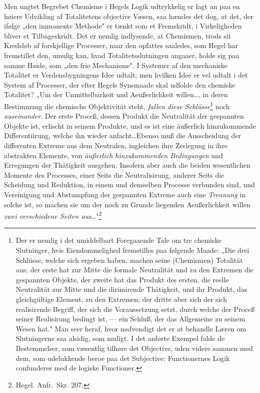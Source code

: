 \documentclass[12pt]{book}
\newcommand{\opage}[1]{\marginnote{\footnotesize\textit{[#1]}}}
\begin{document}
Men uagtet Begrebet Chemisme i Hegels Logik udtrykkelig er lagt an paa en høiere Udvikling af
Totalitetens objective Væsen, saa hændes det dog, at det, der ifølge „den immanente Methode" er tænkt
som et Fremskridt, i Virkeligheden bliver et Tilbageskridt. Det er nemlig indlysende, at Chemismen,
trods sit Kredsløb af forskjellige Processer, naar den opfattes saaledes, som Hegel har fremstillet
den, umulig kan, hvad Totalitetsslutningen angaaer, holde sig paa samme Høide, som „den frie
Mechanisme". I Systemer af den
\opage{438} mechaniske Totalitet er Verdensbygningens Idee udtalt; men hvilken Idee er vel udtalt i det System af
Processer, der efter Hegels Synsmaade skal udfolde den chemiske Totalitet? „Um der Unmittelbarkeit und
Aeußerlichkeit willen\ldots, in deren Bestimmung die chemische Objektivität steht, \emph{fallen diese
Schlüsse}\footnote{Der er nemlig i det umiddelbart Foregaaende Tale om tre chemiske Slutninger, hvis
Eiendommelighed fremstilles paa følgende Maade: „Die drei Schlüsse, welche sich ergeben haben, machen
seine (Chemismen) Totalität aus; der erste hat zur Mitte die formale Neutralität und zu den Extremen
die gespannten Objekte, der zweite hat das Produkt des ersten, die reelle Neutralität zur Mitte und
die dirimirende Thätigkeit, und ihr Produkt, das gleichgültige Element, zu den Extremen; der dritte
aber sich der sich realisirende Begriff, der sich die Voraussetzung setzt, durch welche der Proceß
seiner Realisirung bedingt ist, — ein Schluß, der das Allgemeine zu seinem Wesen hat." Man seer heraf,
hvor nødvendigt det er at behandle Læren om Slutningerne saa alsidig, som muligt. I det anførte
Exempel falde de Bestemmelser, som væsentlig tilhøre det Objective, uden videre sammen med dem, som
udelukkende beroe paa det Subjective: Functionernes Logik confunderes med de logiske Functioner.} noch
\emph{auseinander}. Der erste Proceß, dessen Produkt die Neutralität der gespannten Objekte ist,
erlischt in seinem Produkte, und es ist eine äußerlich hinzukommende Differentiirung, welche ihn
wieder anfacht\ldots Ebenso muß die Ausscheidung der differenten Extreme aus dem Neutralen, ingleichen
ihre Zerlegung in ihre abstrakten Elemente, von \emph{äußerlich hinzukommenden Bedingungen} und
Erregungen der Thätigkeit ausgehen. Insofern aber auch die beiden wesentlichen Momente des Processes,
einer Seits die Neutralisirung, anderer Seits die Scheidung und Reduktion, in einem und demselben
Processe verbunden sind, und Vereinigung und Abstumpfung der gespannten Extreme auch eine
\emph{Trennung} in solche ist, so machen sie
\opage{439} um der noch zu Grunde liegenden Aeußerlichkeit willen \emph{zwei verschiedene Seiten
aus}\ldots"\footnote{Hegel. Anfr.\ Skr. 207.}
\end{document}
